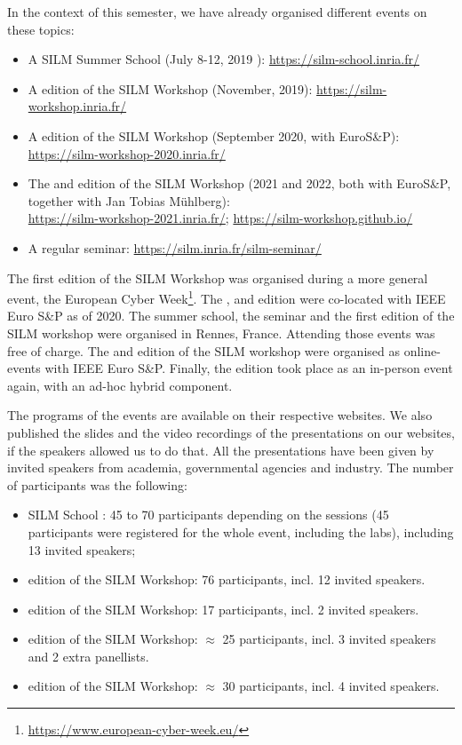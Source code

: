 \documentclass[a4paper,11pt]{article}
\begin{document}
In the context of this semester, we have already organised different events
on these topics:
%
\begin{itemize}
%
    \item A SILM Summer School (July 8-12, 2019 ):
\url{https://silm-school.inria.fr/}
%
    \item A  edition of the SILM Workshop (November, 2019):
\url{https://silm-workshop.inria.fr/}
%
    \item A  edition of the SILM Workshop (September 2020, with
EuroS\&P): \\
\url{https://silm-workshop-2020.inria.fr/}
%
    \item The  and  edition of the SILM Workshop (2021 and 2022, both with
EuroS\&P, together
with Jan Tobias M\"uhlberg): \\
\url{https://silm-workshop-2021.inria.fr/};
\url{https://silm-workshop.github.io/}
%
    \item A regular seminar: \url{https://silm.inria.fr/silm-seminar/}
%
\end{itemize}

The first edition of the SILM Workshop was organised during a more general
event, the European Cyber Week\footnote{\url{https://www.european-cyber-week.eu/}}.
The ,  and  edition were co-located with IEEE Euro S\&P as of 2020. 
% 
The summer school, the seminar and the first edition of the SILM workshop
were organised in Rennes, France. Attending those events was free of
charge. The  and  edition of the SILM workshop were organised as
online-events with IEEE Euro S\&P. Finally, the  edition took place
as an in-person event again, with an ad-hoc hybrid component.

The programs of the events are available on their respective websites. We
also published the slides and the video recordings of the presentations on
our websites, if the speakers allowed us to do that. All the presentations
have been given by invited speakers from academia, governmental agencies
and industry. The number of participants was the following:
%
\begin{itemize}
%
    \item SILM School : 45 to 70 participants depending on the sessions (45
participants were registered for the whole event, including the labs),
including 13 invited speakers;
%
    \item {} edition of the SILM Workshop: 76 participants, incl.
12 invited speakers.
%
    \item {} edition of the SILM Workshop: 17 participants, incl.
2 invited speakers.
%
    \item {} edition of the SILM Workshop: $\approx$ 25 participants,
incl. 3 invited speakers and 2 extra panellists.
%
    \item {} edition of the SILM Workshop: $\approx$ 30 participants,
incl. 4 invited speakers.
%
\end{itemize}
\end{document}
